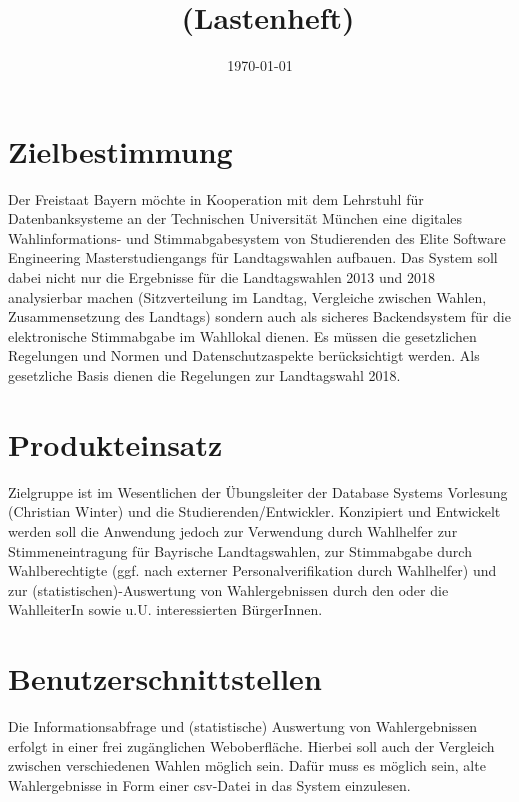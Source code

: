 \documentclass[a4paper,12pt]{article}
\title{\projektName~(Lastenheft)}
\author{\authorName}
\date{\today}
\begin{document}
 \setcounter{page}{2}
 \tableofcontents          %
 \clearpage
 
\section{Zielbestimmung}
Der Freistaat Bayern möchte in Kooperation mit dem Lehrstuhl für Datenbanksysteme an der Technischen Universität München
eine digitales Wahlinformations- und Stimmabgabesystem von Studierenden des Elite Software Engineering Masterstudiengangs 
für Landtagswahlen aufbauen.
Das System soll dabei nicht nur die Ergebnisse für die Landtagswahlen 2013 und 2018 analysierbar machen (Sitzverteilung im
Landtag, Vergleiche zwischen Wahlen, Zusammensetzung des Landtags) sondern auch als sicheres Backendsystem für die
elektronische Stimmabgabe im Wahllokal dienen. Es müssen die gesetzlichen Regelungen und Normen und Datenschutzaspekte
berücksichtigt werden. Als gesetzliche Basis dienen die Regelungen zur Landtagswahl 2018.

\section{Produkteinsatz}
Zielgruppe ist im Wesentlichen der Übungsleiter der Database Systems Vorlesung
(Christian Winter) und die Studierenden/Entwickler. Konzipiert und Entwickelt
werden soll die Anwendung jedoch zur Verwendung durch Wahlhelfer zur 
Stimmeneintragung für Bayrische Landtagswahlen, zur Stimmabgabe durch Wahlberechtigte
(ggf. nach externer Personalverifikation durch Wahlhelfer) und zur (statistischen)-Auswertung
von Wahlergebnissen durch den oder die WahlleiterIn sowie u.U. interessierten BürgerInnen.

\section{Benutzerschnittstellen}
Die Informationsabfrage und (statistische) Auswertung von Wahlergebnissen erfolgt
in einer frei zugänglichen Weboberfläche. Hierbei soll auch der Vergleich zwischen verschiedenen
Wahlen möglich sein. Dafür muss es möglich sein, alte Wahlergebnisse in Form einer csv-Datei in das System einzulesen.  
\end{document}
